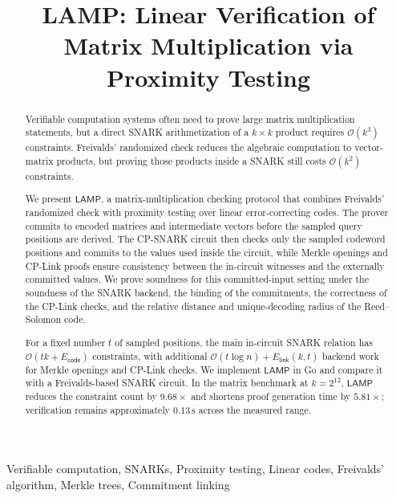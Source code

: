 \documentclass[conference,compsoc]{IEEEtran}
\newcommand{\protocol}{\textsf{LAMP}}   %
\theoremstyle{plain}
\theoremstyle{definition}
\theoremstyle{remark}
\begin{document}
\title{LAMP: Linear Verification of Matrix Multiplication via Proximity Testing}

\author{}

\maketitle

\begin{abstract}

Verifiable computation systems often need to prove large matrix multiplication
statements, but a direct SNARK arithmetization of a \(k \times k\) product
requires \(\mathcal{O}(k^3)\) constraints. Freivalds' randomized check reduces
the algebraic computation to vector-matrix products, but proving those products
inside a SNARK still costs \(\mathcal{O}(k^2)\) constraints.

We present \(\protocol\), a matrix-multiplication checking protocol that combines
Freivalds' randomized check with proximity testing over linear error-correcting
codes. The prover commits to encoded matrices and intermediate vectors before
the sampled query positions are derived. The CP-SNARK circuit then checks only the sampled codeword positions and commits to the values used inside the circuit, while Merkle openings and CP-Link proofs ensure consistency between the in-circuit witnesses and the externally committed values. We prove soundness for this committed-input setting under the soundness of the SNARK backend, the binding of the commitments, the correctness of the CP-Link checks, and the relative distance and unique-decoding radius of the Reed--Solomon code.

For a fixed number \(t\) of sampled positions, the main in-circuit SNARK
relation has \ensuremath{\mathcal{O}(tk+E_{\mathsf{code}})} constraints, with additional
\ensuremath{\mathcal{O}(t\log n)+E_{\mathsf{link}}(k,t)} backend work for Merkle openings
and CP-Link checks. We implement \(\protocol\) in Go and compare it with a
Freivalds-based SNARK circuit. In the matrix benchmark at \(k=2^{12}\),
\(\protocol\) reduces the constraint count by \ensuremath{9.68\times} and shortens proof
generation time by \ensuremath{5.81\times}; verification remains approximately
\ensuremath{0.13\,\text{s}} across the measured range.


\end{abstract}

\begin{IEEEkeywords}
Verifiable computation, SNARKs, Proximity testing, Linear codes, Freivalds' algorithm, Merkle trees, Commitment linking
\end{IEEEkeywords}
\end{document}
